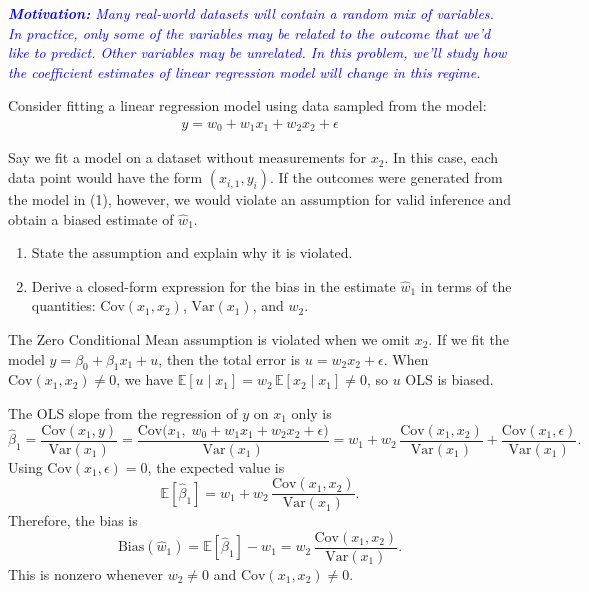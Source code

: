 \documentclass{article}
\newcommand{\E}{\mathbb{E}}
\newcommand{\V}{\text{Var}}
\newcommand{\C}{\text{Cov}}
\begin{document}
\begin{probset}
\newpage

\begin{prob} 
    \textit{\textcolor{blue}{\textbf{Motivation:} Many real-world datasets will contain a random mix of variables. In practice, only some of the variables may be related to the outcome that we'd like to predict. Other variables may be unrelated. In this problem, we'll study how the coefficient estimates of linear regression model will change in this regime.}}

    Consider fitting a linear regression model using data sampled from the model:
    \begin{align}
        y = w_0 + w_1 x_1 + w_2 x_2 + \epsilon
    \end{align}

    \begin{subprobset}
        \begin{subprob}
            Say we fit a model on a dataset without measurements for $x_2$. In this case, each data point would have the form $(x_{i,1}, y_i)$. If the outcomes were generated from the model in (1), however, we would violate an assumption for valid inference and obtain a biased estimate of $\hat{w}_1$.

            \begin{enumerate}[label=\roman*.]
                \item State the assumption and explain why it is violated.
                \item Derive a closed-form expression for the bias in the estimate $\hat{w}_1$ in terms of the quantities: $\C(x_1, x_2)$, $\V(x_1)$, and $w_2$.
            \end{enumerate}

            \begin{soln}
                The Zero Conditional Mean assumption is violated when we omit $x_2$. If we fit the model $y = \beta_0 + \beta_1 x_1 + u$, then the total error is $u = w_2 x_2 + \epsilon$. When $\C(x_1, x_2) \neq 0$, we have $\E[u\mid x_1] = w_2\,\E[x_2\mid x_1] \neq 0$, so $u$ OLS is biased.

                The OLS slope from the regression of $y$ on $x_1$ only is
                \[
                    \hat{\beta}_1 = \frac{\C(x_1, y)}{\V(x_1)}
                    = \frac{\C\big(x_1,\; w_0 + w_1 x_1 + w_2 x_2 + \epsilon\big)}{\V(x_1)}
                    = w_1 + w_2\,\frac{\C(x_1, x_2)}{\V(x_1)} + \frac{\C(x_1,\epsilon)}{\V(x_1)}.
                \]
                Using $\C(x_1,\epsilon)=0$, the expected value is
                \[
                    \E[\hat{\beta}_1] = w_1 + w_2\,\frac{\C(x_1, x_2)}{\V(x_1)}.
                \]
                Therefore, the bias is
                \[
                    \text{Bias}(\hat w_1) = \E[\hat{\beta}_1] - w_1 = w_2\,\frac{\C(x_1, x_2)}{\V(x_1)}.
                \]
                This is nonzero whenever $w_2 \neq 0$ and $\C(x_1, x_2) \neq 0$.
            \end{soln}
        \end{subprob}


\end{subprobset}
\end{prob}
\end{probset}
\end{document}
